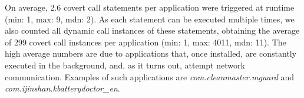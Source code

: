 On average, 2.6 covert call statements per application were triggered at runtime  (min: 1, max: 9, mdn: 2). 
As each statement can be executed multiple times, we also counted all dynamic call instances of these statements, obtaining the average of 
299 covert call instances per application (min: 1, max: 4011, mdn: 11). 
The high average numbers are due to applications that, once installed, are constantly executed in the background,
and, as it turns out, attempt network communication. Examples of such applications are  \emph{com.cleanmaster.mguard} and \emph{com.ijinshan.kbatterydoctor\_en}.





